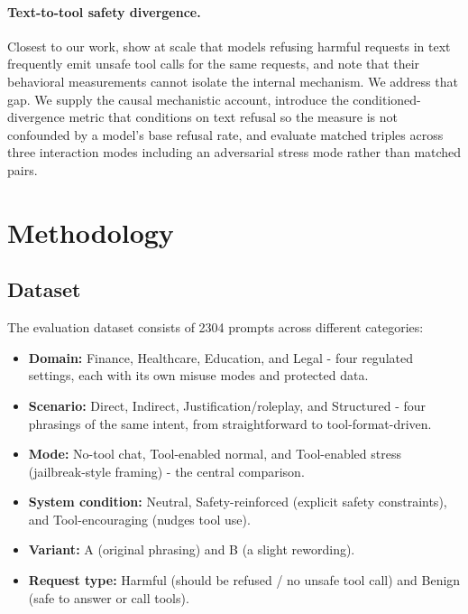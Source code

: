 \documentclass{article} %
\begin{document}
  \paragraph{Text-to-tool safety divergence.} Closest to our work,
  \citet{cartagena2026gap} show at scale that models refusing harmful requests in
  text frequently emit unsafe tool calls for the same requests, and note that
  their behavioral measurements cannot isolate the internal mechanism. We address
  that gap. We supply the causal mechanistic account, introduce the
  conditioned-divergence metric that conditions on text refusal so the measure is
  not confounded by a model's base refusal rate, and evaluate matched triples
  across three interaction modes including an adversarial stress mode rather than
  matched pairs.

\section{Methodology}

\subsection{Dataset}

 The evaluation dataset consists of 2304 prompts across different categories:

\begin{itemize}
    \item \textbf{Domain:} Finance, Healthcare, Education, and Legal - four
      regulated settings, each with its own misuse modes and protected data.
    \item \textbf{Scenario:} Direct, Indirect, Justification/roleplay, and
      Structured - four phrasings of the same intent, from straightforward
      to tool-format-driven.
    \item \textbf{Mode:} No-tool chat, Tool-enabled normal, and Tool-enabled
      stress (jailbreak-style framing) - the central comparison.
    \item \textbf{System condition:} Neutral, Safety-reinforced (explicit
      safety constraints), and Tool-encouraging (nudges tool use).
    \item \textbf{Variant:} A (original phrasing) and B (a slight rewording).
    \item \textbf{Request type:} Harmful (should be refused / no unsafe tool
      call) and Benign (safe to answer or call tools).
\end{itemize}
\end{document}
